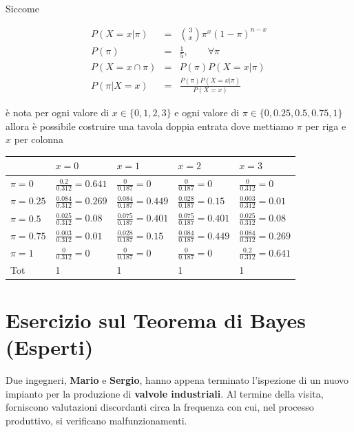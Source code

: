 \documentclass[
  11pt,
]{book}
\theoremstyle{mytheoremstyle}
\theoremstyle{mydefstyle}
\newenvironment{sol}
  {
  \begin{tcolorbox}[enhanced,breakable,arc=0.1mm,boxrule=1pt,colback=white,colframe=iblue,
  title=\bf \fontfamily{lmss}\selectfont \hspace{.5 cm} Soluzione,drop fuzzy shadow]

}{
\end{tcolorbox}
  }
\begin{document}
\begin{sol}

Siccome

\begin{eqnarray*}
  P(X=x|\pi) &=&  \binom{3}{x}\pi^x(1-\pi)^{n-x}\\
  P(\pi)      &=& \frac 15,\qquad \forall \pi\\
  P(X=x\cap\pi) &=& P(\pi)P(X=x|\pi)\\
  P(\pi|X=x) &=& \frac{P(\pi)P(X=x|\pi)}{P(X=x)}
\end{eqnarray*}

è nota per ogni valore di \(x\in\{0,1,2,3\}\) e ogni valore di \(\pi\in\{0,0.25,0.5,0.75,1\}\) allora è possibile costruire una
tavola doppia entrata dove mettiamo \(\pi\) per riga e \(x\) per colonna

\begin{tabular}{lllll}
\toprule
  & $x=0$ & $x=1$ & $x=2$ & $x=3$\\
\midrule
$\pi=0$ & $\frac{0.2}{0.312}=0.641$ & $\frac{0}{0.187}=0$ & $\frac{0}{0.187}=0$ & $\frac{0}{0.312}=0$\\
$\pi=0.25$ & $\frac{0.084}{0.312}=0.269$ & $\frac{0.084}{0.187}=0.449$ & $\frac{0.028}{0.187}=0.15$ & $\frac{0.003}{0.312}=0.01$\\
$\pi=0.5$ & $\frac{0.025}{0.312}=0.08$ & $\frac{0.075}{0.187}=0.401$ & $\frac{0.075}{0.187}=0.401$ & $\frac{0.025}{0.312}=0.08$\\
$\pi=0.75$ & $\frac{0.003}{0.312}=0.01$ & $\frac{0.028}{0.187}=0.15$ & $\frac{0.084}{0.187}=0.449$ & $\frac{0.084}{0.312}=0.269$\\
$\pi=1$ & $\frac{0}{0.312}=0$ & $\frac{0}{0.187}=0$ & $\frac{0}{0.187}=0$ & $\frac{0.2}{0.312}=0.641$\\
Tot & 1 & 1 & 1 & 1\\
\bottomrule
\end{tabular}

\end{sol}

\section{Esercizio sul Teorema di Bayes (Esperti)}\label{esercizio-sul-teorema-di-bayes-esperti}

Due ingegneri, \textbf{Mario} e \textbf{Sergio}, hanno appena terminato l'ispezione di un nuovo impianto per la produzione di \textbf{valvole industriali}. Al termine della visita, forniscono valutazioni discordanti circa la frequenza con cui, nel processo produttivo, si verificano malfunzionamenti.
\end{document}
